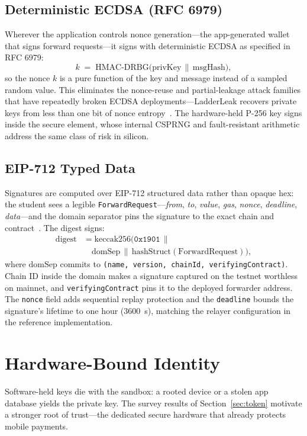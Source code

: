 \documentclass[conference]{IEEEtran}
\begin{document}
\subsection{Deterministic ECDSA (RFC 6979)}
Wherever the application controls nonce generation---the app-generated
wallet that signs forward requests---it signs with deterministic ECDSA as
specified in RFC 6979:
\begin{equation}
k \;=\; \mathrm{HMAC\text{-}DRBG}\big(\mathrm{privKey} \,\|\, \mathrm{msgHash}\big),
\end{equation}
so the nonce $k$ is a pure function of the key and message instead of a
sampled random value. This eliminates the nonce-reuse and partial-leakage
attack families that have repeatedly broken ECDSA deployments---LadderLeak
recovers private keys from less than one bit of nonce
entropy~\cite{Aranha2020LadderLeak}. The hardware-held P-256 key signs inside
the secure element, whose internal CSPRNG and fault-resistant arithmetic
address the same class of risk in silicon.

\subsection{EIP-712 Typed Data}
Signatures are computed over EIP-712 structured data rather than opaque hex:
the student sees a legible \texttt{ForwardRequest}---\emph{from}, \emph{to},
\emph{value}, \emph{gas}, \emph{nonce}, \emph{deadline}, \emph{data}---and the
domain separator pins the signature to the exact chain and
contract~\cite{eip712}. The digest signs:
\begin{equation}\begin{split}
\mathrm{digest} &= \mathrm{keccak256}\!\big(\texttt{0x1901} \,\|\,\\[-2pt]
&\quad \mathrm{domSep} \,\|\, \mathrm{hashStruct}(\mathrm{ForwardRequest})\big),
\end{split}\end{equation}
where $\mathrm{domSep}$ commits to \texttt{(name, version, chainId,
verifyingContract)}. Chain ID inside the domain makes a signature captured on
the testnet worthless on mainnet, and \texttt{verifyingContract} pins it to
the deployed forwarder address. The \texttt{nonce} field adds sequential
replay protection and the \texttt{deadline} bounds the signature's lifetime to
one hour (3600~s), matching the relayer configuration in the reference
implementation.

\section{Hardware-Bound Identity}
\label{sec:hardware}
Software-held keys die with the sandbox: a rooted device or a stolen app
database yields the private key. The survey results of
Section~\ref{sec:token} motivate a stronger root of trust---the dedicated
secure hardware that already protects mobile payments.
\end{document}
